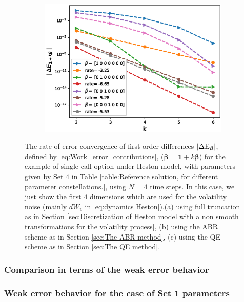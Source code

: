 \begin{figure}[htb]
\begin{subfigure}{0.4\textwidth}
		\includegraphics[width=\linewidth]{./figures/Heston_single_call_QE_moment_matching/mixed_rates/set5/N_4/first_difference_heston_4steps_hierarchical}
		\caption{}
		\label{fig:3}
	\end{subfigure}
	\caption{The rate of error convergence of first order differences $\left\lvert\Delta \text{E}_{\boldsymbol{\beta}}\right\rvert$, defined by \eqref{eq:Work_error_contributions}, ($\boldsymbol{\beta}=\mathbf{1}+k \bar{\boldsymbol{\beta}}$) for the example of single call option under Heston model, with parameters given by Set $4$ in Table \ref{table:Reference solution, for different parameter constellations.}, using $N=4$ time steps. In this case, we just show  the first  $4$ dimensions which are used for the volatility noise (mainly $dW_v$ in \eqref{eq:dynamics Heston}).(a) using full truncation as in Section \ref{sec:Discretization of Heston model with a non smooth transformations for the volatility process}, (b) using the ABR scheme as in Section \ref{sec:The ABR method}, (c) using the QE scheme as in Section \ref{sec:The QE method}.}
	\label{fig:first_diff_Heston_call_N_4_set5}	
\end{figure}
\FloatBarrier

\subsubsection{Comparison in terms of  the weak error behavior}
\subsubsection*{Weak error behavior for the case of Set 1 parameters}


